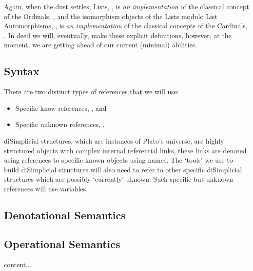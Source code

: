 \documentclass[a4paper,openany]{amsbook}
\begin{document}
Again, when the dust settles, Lists, \Lists, is \emph{an} \emph{implementation}
of the classical concept of the Ordinals, \Ordinal, and the isomorphism objects
of the Lists modulo List Automorphisms, \ListAutomorphisms, is \emph{an}
\emph{implementation} of the classical concepts of the Cardinals, \Cardinal. In
deed we will, eventually, make these explicit definitions, however, at the
moment, we are getting ahead of our current (minimal) abilities.

\subsection{Syntax}

There are two distinct types of references that we will use:
%
\begin{itemize}
\item Specific know references, , and
\item Specific unknown references, .
\end{itemize}
%
diSimplicial structures, which are instances of Plato's universe, are highly
structured objects with complex internal referential links, these links are
denoted using references to specific known objects using names. The `tools' we
use to build diSimplicial structures will also need to refer to other specific
diSimplicial structures which are possibly `currently' uknown. Such specific but
unknown references will use variables.


\subsection{Denotational Semantics}

\subsection{Operational Semantics}



\begin{definition}
content...
\end{definition}



\end{document}
